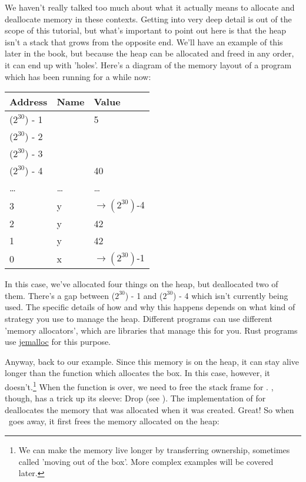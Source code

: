 \blank

We haven't really talked too much about what it actually means to allocate and deallocate memory in these contexts. Getting into very 
deep detail is out of the scope of this tutorial, but what's important to point out here is that the heap isn't a stack that grows from 
the opposite end. We'll have an example of this later in the book, but because the heap can be allocated and freed in any order, it can 
end up with 'holes'. Here's a diagram of the memory layout of a program which has been running for a while now:

\begin{table}[H]
  \begin{tabular}{|l|l|l|}
    \hline
    \textbf{Address} & \textbf{Name} & \textbf{Value} \\
    \hline
    ($2^{30}$) - 1 & & 5 \\
    \hline
    ($2^{30}$) - 2 & & \\
    \hline
    ($2^{30}$) - 3 & & \\
    \hline
    ($2^{30}$) - 4 & & 40 \\
    \hline
    \ldots & \ldots & \ldots \\
    \hline
    3 & y & $\rightarrow(2^{30})$-4 \\
    \hline
    2 & y & 42 \\
    \hline
    1 & y & 42 \\
    \hline
    0 & x & $\rightarrow(2^{30})$-1 \\
    \hline
  \end{tabular}
\end{table}

In this case, we've allocated four things on the heap, but deallocated two of them. There's a gap between ($2^{30}$) - 1 and ($2^{30}$) - 4 
which isn't currently being used. The specific details of how and why this happens depends on what kind of strategy you use to manage the 
heap. Different programs can use different 'memory allocators', which are libraries that manage this for you. Rust programs use 
\href{http://www.canonware.com/jemalloc/}{jemalloc} for this purpose.

\blank

Anyway, back to our example. Since this memory is on the heap, it can stay alive longer than the function which allocates the box. In 
this case, however, it doesn't.\footnote{We can make the memory live longer by transferring ownership, sometimes called 'moving out of 
the box'. More complex examples will be covered later.} When the function is over, we need to free the stack frame for . 
, though, has a trick up its sleeve: Drop (see ). The implementation of  for 
deallocates the memory that was allocated when it was created. Great! So when \x\ goes away, it first frees the memory allocated on the 
heap:


